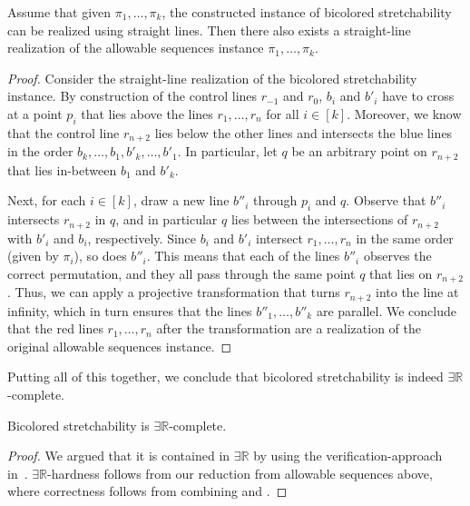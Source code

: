 \documentclass[a4paper,UKenglish,cleveref, autoref, thm-restate, nolineno]{socg-lipics-v2021}
\newcommand{\ER}{\exists\mathbb{R}}
\newcommand{\AS}{allowable sequences\xspace}
\begin{document}
\begin{lemma}
\label{lemma:bic_stretch_3}
    Assume that given $\pi_1, \dots, \pi_k$, the constructed instance of bicolored stretchability can be realized using straight lines. Then there also exists a straight-line realization of the \AS instance $\pi_1, \dots, \pi_k$. 
\end{lemma}
\begin{proof}
    Consider the straight-line realization of the bicolored stretchability instance. By construction of the control lines $r_{-1}$ and $r_0$, $b_i$ and $b'_i$ have to cross at a point $p_i$ that lies above the lines $r_1, \dots, r_n$ for all $i \in [k]$. Moreover, we know that the control line $r_{n + 2}$ lies below the other lines and intersects the blue lines in the order $b_k, \dots, b_1, b'_k, \dots, b'_1$. In particular, let $q$ be an arbitrary point on $r_{n + 2}$ that lies in-between $b_1$ and $b'_k$. 

    Next, for each $i \in [k]$, draw a new line $b''_i$ through $p_i$ and $q$. Observe that $b''_i$ intersects $r_{n + 2}$ in $q$, and in particular $q$ lies between the intersections of $r_{n + 2}$ with $b'_i$ and $b_i$, respectively. Since $b_i$ and $b'_i$ intersect $r_1, \dots, r_n$ in the same order (given by $\pi_i$), so does $b''_i$. This means that each of the lines $b''_i$ observes the correct permutation, and they all pass through the same point $q$ that lies on $r_{n + 2}$. Thus, we can apply a projective transformation that turns $r_{n + 2}$ into the line at infinity, which in turn ensures that the lines $b''_1, \dots, b''_k$ are parallel. We conclude that the red lines $r_1, \dots, r_n$ after the transformation are a realization of the original \AS instance.   
\end{proof}

Putting all of this together, we conclude that bicolored stretchability is indeed $\ER$-complete. 

\begin{theorem}
\label{theorem:er-hardness}
    Bicolored stretchability is $\ER$-complete.
\end{theorem}
\begin{proof}
    We argued that it is contained in $\ER$ by using the verification-approach in~\cite{ericksonSmoothingGapNP2024}. $\ER$-hardness follows from our reduction from allowable sequences above, where correctness follows from combining  and .
\end{proof}
\end{document}
